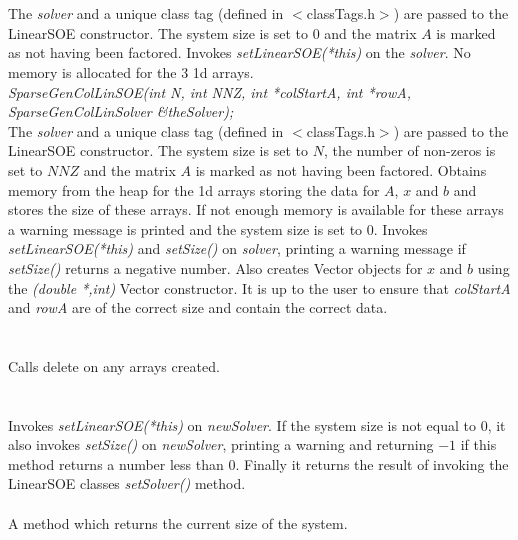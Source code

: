   \\
  \\
The {\em solver} and a unique class tag (defined in $<$classTags.h$>$)
are passed to the LinearSOE constructor. The system size is set
to $0$ and the matrix $A$ is marked as not having been factored. Invokes
{\em setLinearSOE(*this)} on the {\em solver}. No memory is
allocated for the 3 1d arrays. \\  


{\em SparseGenColLinSOE(int N, int NNZ, int *colStartA,
int *rowA, SparseGenColLinSolver \&theSolver); }\\
The {\em solver} and a unique class tag (defined in $<$classTags.h$>$)
are passed to the LinearSOE constructor. The system size is set
to $N$, the number of non-zeros is set to $NNZ$ and the matrix $A$ is
marked as not having been factored. Obtains memory from the heap for
the 1d arrays storing the data for $A$, $x$ and $b$ and stores the
size of these arrays. If not enough memory is available for these
arrays a warning message is printed and the system size is set to
$0$. Invokes {\em setLinearSOE(*this)} and {\em setSize()} on {\em solver},
printing a warning message if {\em setSize()} returns a negative
number. Also creates Vector objects for $x$ and $b$ using the {\em
(double *,int)} Vector constructor. It is up to the user to ensure
that {\em colStartA} and {\em rowA} are of the correct size and
contain the correct data. \\

 \\
\\ 
Calls delete on any arrays created. \\

 \\
\\
Invokes {\em setLinearSOE(*this)} on {\em newSolver}.
If the system size is not equal to $0$, it also invokes {\em setSize()}
on {\em newSolver}, printing a warning and returning $-1$ if this
method returns a number less than $0$. Finally it returns the result
of invoking the LinearSOE classes {\em setSolver()} method. \\

 \\
A method which returns the current size of the system. \\

